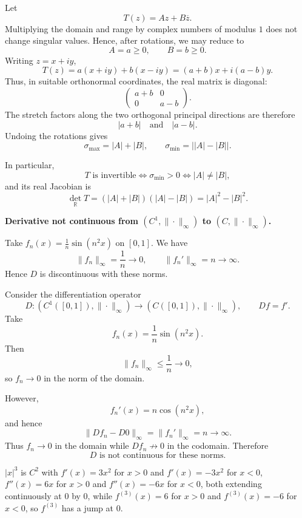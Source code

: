 \begin{solution}
Let
\[
T(z)=Az+B\overline z.
\]
Multiplying the domain and range by complex numbers of modulus \(1\) does not change
singular values. Hence, after rotations, we may reduce to
\[
A=a\ge0,\qquad B=b\ge0.
\]
Writing \(z=x+iy\),
\[
T(z)
=
a(x+iy)+b(x-iy)
=
(a+b)x+i(a-b)y.
\]
Thus, in suitable orthonormal coordinates, the real matrix is diagonal:
\[
\begin{pmatrix}
a+b&0\\
0&a-b
\end{pmatrix}.
\]
The stretch factors along the two orthogonal principal directions are therefore
\[
|a+b|
\quad\text{and}\quad
|a-b|.
\]
Undoing the rotations gives
\[
\boxed{
\sigma_{\max}=|A|+|B|,
\qquad
\sigma_{\min}=\bigl||A|-|B|\bigr|.
}
\]

In particular,
\[
T\text{ is invertible}
\iff
\sigma_{\min}>0
\iff
|A|\neq|B|,
\]
and its real Jacobian is
\[
\det_{\mathbb R}T
=
(|A|+|B|)(|A|-|B|)
=
|A|^2-|B|^2.
\]
\end{solution}


\begin{problem}[CP-IV-0094]
\label{prob:cp-iv-0094}
\par\noindent\textbullet\quad \textbf{Derivative not continuous from $(C^1,\|\cdot\|_\infty)$ to $(C,\|\cdot\|_\infty)$.}

	Take $f_n(x)=\tfrac{1}{n}\sin(n^2 x)$ on $[0,1]$.
	We have
	\[
	\|f_n\|_\infty=\frac{1}{n}\longrightarrow 0,
	\qquad
	\|f_n'\|_\infty = n \longrightarrow \infty .
	\]
	Hence $D$ is discontinuous with these norms.

	\medskip
\end{problem}

\begin{solution}
Consider the differentiation operator
\[
D:(C^1([0,1]),\|\cdot\|_\infty)
\longrightarrow
(C([0,1]),\|\cdot\|_\infty),
\qquad
Df=f'.
\]
Take
\[
f_n(x)=\frac1n\sin(n^2x).
\]
Then
\[
\|f_n\|_\infty\le\frac1n\longrightarrow0,
\]
so \(f_n\to0\) in the norm of the domain.

However,
\[
f_n'(x)=n\cos(n^2x),
\]
and hence
\[
\|Df_n-D0\|_\infty
=
\|f_n'\|_\infty
=
n\longrightarrow\infty.
\]
Thus \(f_n\to0\) in the domain while \(Df_n\not\to0\) in the codomain. Therefore
\[
\boxed{D\text{ is not continuous for these norms}.}
\]
\end{solution}


\begin{problem}[CP-IV-0095]
\label{prob:cp-iv-0095}
$|x|^3$ is $C^2$ with
$f'(x)=3x^2$ for $x>0$ and $f'(x)=-3x^2$ for $x<0$,
$f''(x)=6x$ for $x>0$ and $f''(x)=-6x$ for $x<0$, both extending continuously at $0$ by $0$,
while $f^{(3)}(x)=6$ for $x>0$ and $f^{(3)}(x)=-6$ for $x<0$, so $f^{(3)}$ has a jump at $0$.
\end{problem}

